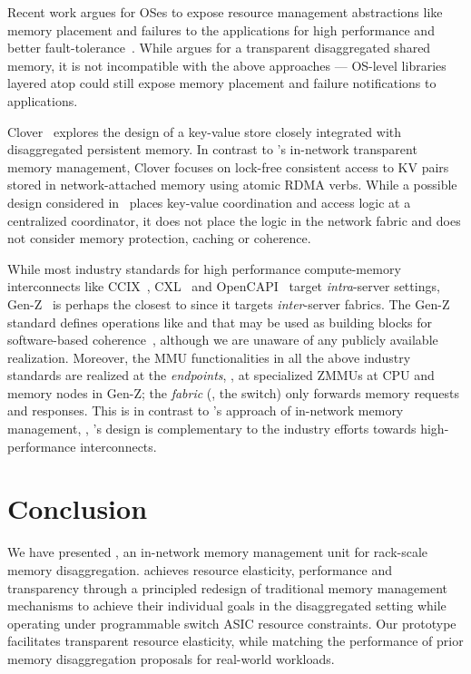  Recent work argues for OSes to expose resource management abstractions like memory placement and failures to the applications for high performance and better fault-tolerance~\cite{disaggapp, disaggfault}. While \mind argues for a transparent disaggregated shared memory, it is not incompatible with the above approaches --- OS-level libraries layered atop \mind could still expose memory placement and failure notifications to applications. 

Clover~\cite{clover} explores the design of a key-value store closely integrated with disaggregated persistent memory. In contrast to \mindx's in-network transparent memory management, Clover focuses on lock-free consistent access to KV pairs stored in network-attached memory using atomic RDMA verbs. While a possible design considered in~\cite{clover} places key-value coordination and access logic at a centralized coordinator, it does not place the logic in the network fabric and does not consider memory protection, caching or coherence.

 While most industry standards for high performance compute-memory interconnects like CCIX~\cite{ccix}, CXL~\cite{cxl} and OpenCAPI~\cite{opencapi} target \textit{intra}-server settings, Gen-Z~\cite{genz} is perhaps the closest to \mind since it targets \textit{inter}-server fabrics. The Gen-Z standard defines operations like  and  that may be used as building blocks for software-based coherence~\cite{genz, genz1}, although we are unaware of any publicly available realization. Moreover, the MMU functionalities in all the above industry standards are realized at the \textit{endpoints}, \eg, at specialized ZMMUs at CPU and memory nodes in Gen-Z; the \textit{fabric} (\eg, the switch) only forwards memory requests and responses. This is in contrast to \mind's approach of in-network memory management, \ie, \mind's design is complementary to the industry efforts towards high-performance interconnects.

\section{Conclusion}

We have presented \mind, an in-network memory management unit for rack-scale memory disaggregation. \mind achieves resource elasticity, performance and transparency through a principled redesign of traditional memory management mechanisms to achieve their individual goals in the disaggregated setting while operating under programmable switch ASIC resource constraints. Our \mind prototype facilitates transparent resource elasticity, while matching the performance of prior memory disaggregation proposals for real-world workloads.




